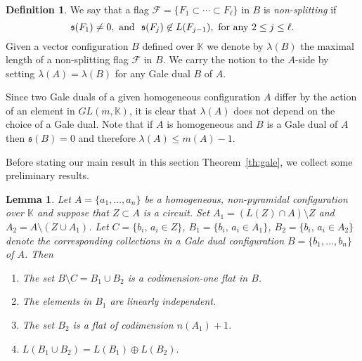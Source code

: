 \documentclass[11pt]{amsart}
\theoremstyle{plain}
\newtheorem{lemma}[theorem]{Lemma}
\theoremstyle{definition}
\newtheorem{definition}[theorem]{Definition}
\theoremstyle{remark}
\renewcommand{\k}{{\mathbb K}}
\newcommand{\fs}{\mathfrak s}
\numberwithin{equation}{section}
\begin{document}
\begin{definition}\label{def:nsf}
We say that a flag $\mathcal F=  \{F_1 \subset \cdots \subset F_\ell\}$  in $B$ is
 {\em non-splitting} if 
$$\fs(F_1)\not=0, \hbox{\  and \ } \fs(F_j)  \not\in L(F_{j-1}), \hbox{\  for any\  } 2\leq j \leq \ell .$$
%
Given a vector configuration $B$ defined over $\k$ we denote by 
$\lambda(B)$ the maximal length of a non-splitting flag $\mathcal F$ in $B$.
  We carry the notion to the $A$-side by setting $\lambda(A) = \lambda(B)$ for any Gale dual $B$ of $A$.  
\end{definition}
  
Since two Gale duals of a given 
  homogeneous configuration $A$ differ by the action of an element in $GL(m,\k)$, it is clear that $\lambda(A)$ does not depend on the choice of a Gale dual. 
Note that if $A$ is homogeneous and $B$ is a Gale dual of $A$ then 
$\fs(B)=0$ and therefore $\lambda(A) \leq m(A)-1$.

\smallskip

Before stating our main result in this section Theorem~\ref{th:gale}, we collect some preliminary results.

\begin{lemma}\label{circuit-lemma}
Let $A= \{a_1, \dots, a_{n}\}$ be a homogeneous, non-pyramidal  configuration over $\k$ and suppose that
$Z \subset A$ is a circuit.  Set
$A_1 = (L(Z)  \cap A) \setminus Z$
and $A_2 = A \setminus (Z \cup A_1)$. Let $C = \{b_i, \, a_i \in Z\}$, $B_1= \{b_i, \, a_i \in A_1\}$, $B_2= \{b_i, \, a_i \in A_2\}$ denote the 
corresponding collections in a Gale dual configuration $B =\{b_1, \dots, b_{n}\}$ of $A$.  Then
\begin{enumerate}
\item[i)] The set $B \setminus C = B_1 \cup B_2$ is a codimension-one flat in $B$.
\item[ii)] The elements in $B_1$ are linearly independent.
\item[iii)] The set $B_2$ is a flat of codimension $n(A_1)+1$.
\item[iv)] $ L(B_1 \cup B_2) = L(B_1) \oplus L(B_2).$
\end{enumerate}
\end{lemma}
\end{document}
